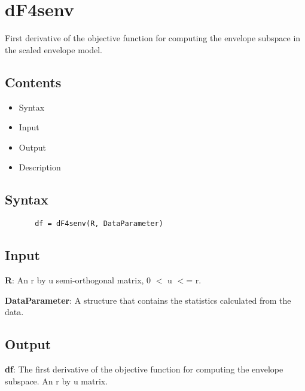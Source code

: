 \documentclass[a4paper,11pt,openany]{memoir}
\begin{document}
\rmfamily
\color{black}\section{dF4senv}

\begin{par}
First derivative of the objective function for computing the envelope subspace in the scaled envelope model.
\end{par} \vspace{1em}

\subsection*{Contents}

\begin{itemize}
\setlength{\itemsep}{-1ex}
   \item Syntax
   \item Input
   \item Output
   \item Description
\end{itemize}


\subsection*{Syntax}


\begin{verbatim}       df = dF4senv(R, DataParameter)\end{verbatim}
    

\subsection*{Input}

\begin{par}
\textbf{R}: An r by u semi-orthogonal matrix, 0 \ensuremath{<} u \ensuremath{<}= r.
\end{par} \vspace{1em}
\begin{par}
\textbf{DataParameter}: A structure that contains the statistics calculated from the data.
\end{par} \vspace{1em}


\subsection*{Output}

\begin{par}
\textbf{df}: The first derivative of the objective function for computing the  envelope subspace.  An r by u matrix.
\end{par} \vspace{1em}
\end{document}

